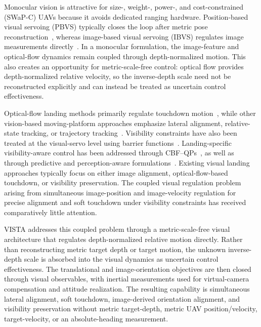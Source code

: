 \documentclass[10pt,conference]{IEEEtran}
\begin{document}
Monocular vision is attractive for size-, weight-, power-, and cost-constrained (SWaP-C) UAVs because it avoids dedicated ranging hardware. Position-based visual servoing (PBVS) typically closes the loop after metric pose reconstruction~\cite{lin2022}, whereas image-based visual servoing (IBVS) regulates image measurements directly~\cite{chaumette2006,lee2012,xie2020,lin2023}. In a monocular formulation, the image-feature and optical-flow dynamics remain coupled through depth-normalized motion. This also creates an opportunity for metric-scale-free control: optical flow provides depth-normalized relative velocity, so the inverse-depth scale need not be reconstructed explicitly and can instead be treated as uncertain control effectiveness.

Optical-flow landing methods primarily regulate touchdown motion~\cite{izzo2011,herisse2012,ho2018,singhal2025}, while other vision-based moving-platform approaches emphasize lateral alignment, relative-state tracking, or trajectory tracking~\cite{lin2022,zhao2021,zhang2026,lin2023,cho2022}. Visibility constraints have also been treated at the visual-servo level using barrier functions~\cite{salehi2021}. Landing-specific visibility-aware control has been addressed through CBF--QPs~\cite{huang2022}, as well as through predictive and perception-aware formulations~\cite{yang2025,angelis2026}. Existing visual landing approaches typically focus on either image alignment, optical-flow-based touchdown, or visibility preservation. The coupled visual regulation problem arising from simultaneous
image-position and image-velocity regulation for precise alignment and soft touchdown under visibility constraints has received comparatively little attention.

VISTA addresses this coupled problem through a metric-scale-free visual architecture that regulates depth-normalized relative motion directly. Rather than reconstructing metric target depth or target motion, the unknown inverse-depth scale is absorbed into the visual dynamics as uncertain control effectiveness. The translational and image-orientation objectives are then closed through visual observables, with inertial measurements used for virtual-camera compensation and attitude realization. The resulting capability is simultaneous lateral alignment, soft touchdown, image-derived orientation alignment, and visibility preservation without metric target-depth, metric UAV position/velocity, target-velocity, or an absolute-heading measurement.
\end{document}
